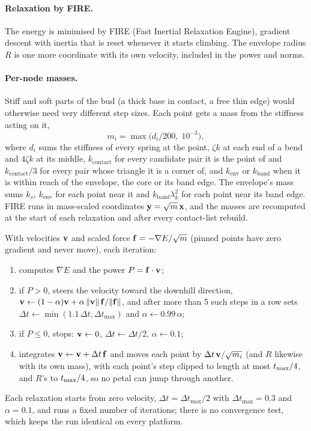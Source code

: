 \paragraph{Relaxation by FIRE.} The energy is minimised by FIRE (Fast Inertial
Relaxation Engine), gradient descent with inertia that is reset whenever it
starts climbing. The envelope radius $R$ is one more coordinate with its own
velocity, included in the power and norms.

\paragraph{Per-node masses.} Stiff and soft parts of the bud (a thick base in
contact, a free thin edge) would otherwise need very different step sizes.
Each point gets a mass from the stiffness acting on it,
\[
  m_i = \max\bigl(d_i/200,\; 10^{-3}\bigr),
\]
where $d_i$ sums the stiffness of every spring at the point, $\zeta k$ at each
end of a bend and $4\zeta k$ at its middle, $k_{\mathrm{contact}}$ for every
candidate pair it is the point of and $k_{\mathrm{contact}}/3$ for every pair
whose triangle it is a corner of, and $k_{\mathrm{env}}$ or $k_{\mathrm{band}}$
when it is within reach of the envelope, the core or its band edge. The
envelope's mass sums $k_s$, $k_{\mathrm{env}}$ for each point near it and
$k_{\mathrm{band}}\lambda_k^2$ for each point near its band edge. FIRE runs in
mass-scaled coordinates $\mathbf{y} = \sqrt m\,\mathbf{x}$, and the masses are recomputed
at the start of each relaxation and after every contact-list rebuild.

With velocities $\mathbf{v}$ and scaled force $\mathbf{f} = -\nabla E/\sqrt m$ (pinned
points have zero gradient and never move), each iteration:
\begin{enumerate}[leftmargin=*]
\item computes $\nabla E$ and the power $P = \mathbf{f}\cdot \mathbf{v}$;
\item if $P > 0$, steers the velocity toward the downhill direction,
  $\mathbf{v} \leftarrow (1-\alpha)\mathbf{v} + \alpha\,\lVert\mathbf{v}\rVert\,\mathbf{f}/\lVert\mathbf{f}\rVert$,
  and after more than 5 such steps in a row sets
  $\Delta t \leftarrow \min(1.1\,\Delta t, \Delta t_{\max})$ and $\alpha \leftarrow 0.99\,\alpha$;
\item if $P \le 0$, stops: $\mathbf{v} \leftarrow 0$, $\Delta t \leftarrow \Delta t/2$, $\alpha\leftarrow 0.1$;
\item integrates $\mathbf{v} \leftarrow \mathbf{v} + \Delta t\,\mathbf{f}$ and moves each
  point by $\Delta t\,\mathbf{v}/\sqrt{m_i}$ (and $R$ likewise with its own mass),
  with each point's step clipped to length at most $t_{\max}/4$, and $R$'s to
  $t_{\max}/4$, so no petal can jump through another.
\end{enumerate}
Each relaxation starts from zero velocity, $\Delta t = \Delta t_{\max}/2$ with
$\Delta t_{\max} = 0.3$ and $\alpha = 0.1$, and runs a fixed number of
iterations; there is no convergence test, which keeps the run identical on
every platform.

